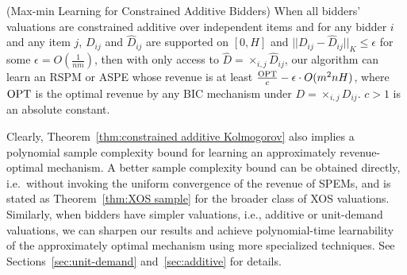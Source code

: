 \begin{theorem}\label{thm:constrained additive Kolmogorov}(Max-min Learning for Constrained Additive Bidders)
	When all bidders' valuations are constrained additive over independent items and for any bidder $i$ and any item $j$, $D_{ij}$ and $\hat{D}_{ij}$ are supported on $[0,H]$ and $||D_{ij}-\hat{D}_{ij}||_K\leq \epsilon$  for some $\epsilon=O(\frac{1}{nm})$, then with only access to $\hat{D}=\times_{i,j} \hat{D}_{ij}$, our algorithm can learn an RSPM or ASPE whose revenue is at least $\frac{\text{OPT}}{c}-{ \epsilon\cdot O(m^2n H)}$, where $\text{OPT}$ is the optimal revenue by any BIC mechanism under $D=\times_{i,j} D_{ij}$. $c>1$ is an absolute constant.
	\end{theorem}
	
Clearly, Theorem~\ref{thm:constrained additive Kolmogorov} also implies a polynomial sample complexity bound for learning an approximately revenue-optimal mechanism. A better sample complexity bound can be obtained directly, i.e.~without invoking the uniform convergence of the revenue of SPEMs, and  is stated as Theorem~\ref{thm:XOS sample} for the broader class of XOS valuations. Similarly, when bidders have simpler valuations, i.e., additive or unit-demand valuations, we can sharpen our results and achieve polynomial-time learnability of the approximately optimal mechanism using more specialized techniques. See Sections~\ref{sec:unit-demand} and~\ref{sec:additive} for details.